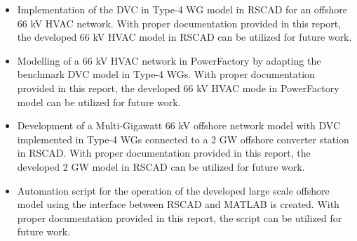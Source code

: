 \begin{itemize}
    \item Implementation of the \gls{DVC} in Type-4 \gls{WG} model in RSCAD for an offshore 66 kV \gls{HVAC} network. With proper documentation provided in this report, the developed 66 kV \gls{HVAC} model in RSCAD can be utilized for future work.
    
    \item Modelling of a 66 kV \gls{HVAC} network in PowerFactory by adapting the benchmark \gls{DVC} model in Type-4 \gls{WG}s. With proper documentation provided in this report, the developed 66 kV \gls{HVAC} mode in PowerFactory model can be utilized for future work.
    
    \item Development of a Multi-Gigawatt 66 kV offshore network model with \gls{DVC} implemented in Type-4 \gls{WG}s connected to a 2 GW offshore converter station in RSCAD. With proper documentation provided in this report, the developed 2 GW model in RSCAD can be utilized for future work.
    
    \item Automation script for the operation of the developed large scale offshore model using the interface between RSCAD and MATLAB is created. With
    proper documentation provided in this report, the script can be utilized for future work.
\end{itemize}

